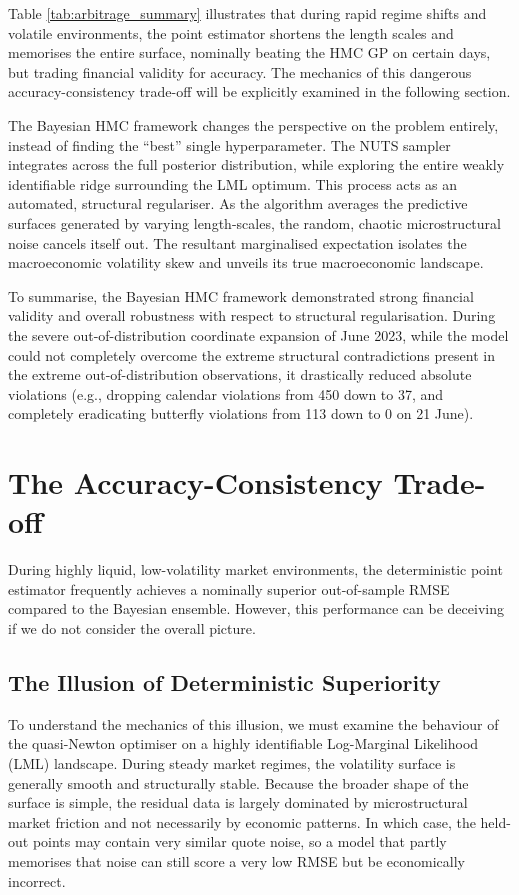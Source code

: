 \documentclass[12pt,oneside]{report}
\theoremstyle{definition}
\theoremstyle{remark}
\begin{document}
Table \ref{tab:arbitrage_summary} illustrates that during rapid regime shifts and volatile environments, the point estimator shortens the length scales and memorises the entire surface, nominally beating the HMC GP on certain days, but trading financial validity for accuracy. The mechanics of this dangerous accuracy-consistency trade-off will be explicitly examined in the following section.

The Bayesian HMC framework changes the perspective on the problem entirely, instead of finding the “best” single hyperparameter. The NUTS sampler integrates across the full posterior distribution, while exploring the entire weakly identifiable ridge surrounding the LML optimum. This process acts as an automated, structural regulariser. As the algorithm averages the predictive surfaces generated by varying length-scales, the random, chaotic microstructural noise cancels itself out. The resultant marginalised expectation isolates the macroeconomic volatility skew and unveils its true macroeconomic landscape.

To summarise, the Bayesian HMC framework demonstrated strong financial validity and overall robustness with respect to structural regularisation. During the severe out-of-distribution coordinate expansion of June 2023, while the model could not completely overcome the extreme structural contradictions present in the extreme out-of-distribution observations, it drastically reduced absolute violations (e.g., dropping calendar violations from 450 down to 37, and completely eradicating butterfly violations from 113 down to 0 on 21 June).

\section{The Accuracy-Consistency Trade-off}
\label{sec:accuracy_consistency_tradeoff}
During highly liquid, low-volatility market environments, the deterministic point estimator frequently achieves a nominally superior out-of-sample RMSE compared to the Bayesian ensemble. However, this performance can be deceiving if we do not consider the overall picture.

\subsection{The Illusion of Deterministic Superiority}To understand the mechanics of this illusion, we must examine the behaviour of the quasi-Newton optimiser on a highly identifiable Log-Marginal Likelihood (LML) landscape. During steady market regimes, the volatility surface is generally smooth and structurally stable. Because the broader shape of the surface is simple, the residual data is largely dominated by microstructural market friction and not necessarily by economic patterns. In which case, the held-out points may contain very similar quote noise, so a model that partly memorises that noise can still score a very low RMSE but be economically incorrect.
\end{document}
